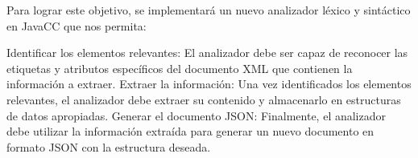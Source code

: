 Para lograr este objetivo, se implementará un nuevo analizador léxico y sintáctico en JavaCC que nos permita:

Identificar los elementos relevantes: El analizador debe ser capaz de reconocer las etiquetas y atributos específicos del documento XML que contienen la información a extraer.
Extraer la información: Una vez identificados los elementos relevantes, el analizador debe extraer su contenido y almacenarlo en estructuras de datos apropiadas.
Generar el documento JSON: Finalmente, el analizador debe utilizar la información extraída para generar un nuevo documento en formato JSON con la estructura deseada.






